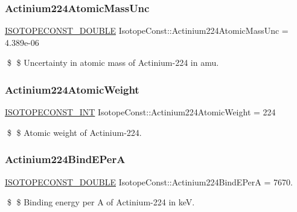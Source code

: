\subsubsection{\texorpdfstring{Actinium224\+Atomic\+Mass\+Unc}{Actinium224AtomicMassUnc}}
{\footnotesize\ttfamily \mbox{\hyperlink{group___isotope_const-_macros_ga8f45a7272ce02c0b4c65c44636ed719a}{I\+S\+O\+T\+O\+P\+E\+C\+O\+N\+S\+T\+\_\+\+D\+O\+U\+B\+LE}} Isotope\+Const\+::\+Actinium224\+Atomic\+Mass\+Unc = 4.\+389e-\/06}

\$ \$ Uncertainty in atomic mass of Actinium-\/224 in amu. \mbox{\label{group___isotope_const-_actinium-_ac224_ga6b80c72612eb047d5c9826c25d9b4b69}} 
\subsubsection{\texorpdfstring{Actinium224\+Atomic\+Weight}{Actinium224AtomicWeight}}
{\footnotesize\ttfamily \mbox{\hyperlink{group___isotope_const-_macros_ga5f18360b3e99483a35c32d789e62621c}{I\+S\+O\+T\+O\+P\+E\+C\+O\+N\+S\+T\+\_\+\+I\+NT}} Isotope\+Const\+::\+Actinium224\+Atomic\+Weight = 224}

\$ \$ Atomic weight of Actinium-\/224. \mbox{\label{group___isotope_const-_actinium-_ac224_ga3bfef9ae14a98983306d82121f8bd316}} 
\subsubsection{\texorpdfstring{Actinium224\+Bind\+E\+PerA}{Actinium224BindEPerA}}
{\footnotesize\ttfamily \mbox{\hyperlink{group___isotope_const-_macros_ga8f45a7272ce02c0b4c65c44636ed719a}{I\+S\+O\+T\+O\+P\+E\+C\+O\+N\+S\+T\+\_\+\+D\+O\+U\+B\+LE}} Isotope\+Const\+::\+Actinium224\+Bind\+E\+PerA = 7670.}

\$ \$ Binding energy per A of Actinium-\/224 in keV. \mbox{\label{group___isotope_const-_actinium-_ac224_ga656d9c6fccbd8b0a7abe60db5280ea0e}} 
